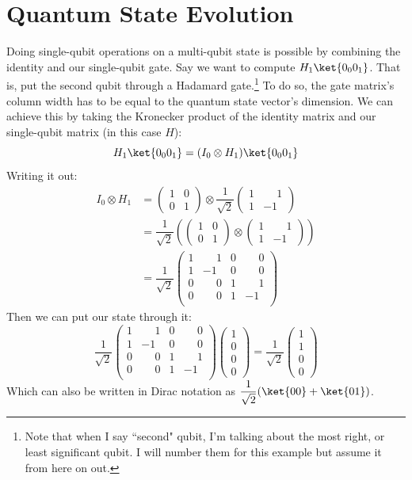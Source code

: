 \documentclass[11pt, notitlepage]{report}
\newcommand{\igate}{
  \begin{pmatrix}
  1 & 0 \\
  0 & 1
  \end{pmatrix}
}
\newcommand{\hgate}{
  \dfrac{1}{\sqrt2}
  \begin{pmatrix}
  1 & \phantom{-}1 \\
  1 & -1
  \end{pmatrix}
}
\begin{document}
\section{Quantum State Evolution}
Doing single-qubit operations on a multi-qubit state is possible by combining the identity and our single-qubit gate. Say we want to compute $H_1\ket{0_0 0_1}$. That is, put the second qubit through a Hadamard gate.\footnote{Note that when I say ``second" qubit, I'm talking about the most right, or least significant qubit. I will number them for this example but assume it from here on out.} To do so, the gate matrix's column width has to be equal to the quantum state vector's dimension. We can achieve this by taking the Kronecker product of the identity matrix and our single-qubit matrix (in this case $H$):
\[
  H_1\ket{0_0 0_1} = (I_0 \otimes H_1)\ket{0_0 0_1}
\]
Writing it out:
\begin{align*}
  I_0 \otimes H_1 &=
  \igate{} \otimes \hgate{} \\
  &=
  \dfrac{1}{\sqrt2}
  \left(
  \igate{}
  \otimes
  \begin{pmatrix}
  1 & \phantom{-}1 \\
  1 & -1
  \end{pmatrix}
  \right) \\
  &= \dfrac{1}{\sqrt2}
  \begin{pmatrix}
  1 & \phantom{-}1 & 0 & \phantom{-}0 \\
  1 & -1 & 0 & \phantom{-}0 \\
  0 & \phantom{-}0 & 1 & \phantom{-}1 \\
  0 & \phantom{-}0 & 1 & -1 \\
  \end{pmatrix}
\end{align*}
Then we can put our  state through it:
\[
  \dfrac{1}{\sqrt2}
  \begin{pmatrix}
  1 & \phantom{-}1 & 0 & \phantom{-}0 \\
  1 & -1 & 0 & \phantom{-}0 \\
  0 & \phantom{-}0 & 1 & \phantom{-}1 \\
  0 & \phantom{-}0 & 1 & -1 \\
  \end{pmatrix}
  \begin{pmatrix}
  1 \\
  0 \\
  0 \\
  0
  \end{pmatrix}
  =
  \dfrac{1}{\sqrt2}
  \begin{pmatrix}
  1 \\
  1 \\
  0 \\
  0
  \end{pmatrix}
\]
Which can also be written in Dirac notation as $\dfrac{1}{\sqrt2}(\ket{00} + \ket{01})$.
\end{document}
